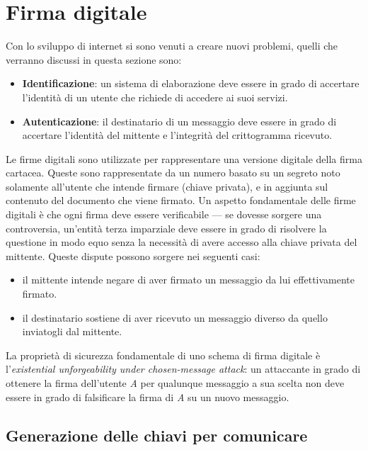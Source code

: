 \documentclass[12pt, a4paper]{report}
\begin{document}
\section{Firma digitale}
\label{sec:firma_digitale}
Con lo sviluppo di internet si sono venuti a creare nuovi problemi, quelli che verranno discussi in questa sezione sono:
\begin{itemize}
\item \textbf{Identificazione}: un sistema di elaborazione deve essere in grado di accertare l'identità di un utente che richiede di accedere ai suoi servizi.
\item \textbf{Autenticazione}: il destinatario di un messaggio deve essere in grado di accertare l'identità del mittente e l'integrità del crittogramma ricevuto.
\end{itemize}
Le firme digitali sono utilizzate per rappresentare una versione digitale della firma cartacea. Queste sono rappresentate da un numero basato su un segreto noto solamente all'utente che intende firmare (chiave privata), e in aggiunta sul contenuto del documento che viene firmato.
Un aspetto fondamentale delle firme digitali è che ogni firma deve essere verificabile — se dovesse sorgere una controversia, un'entità terza imparziale deve essere in grado di risolvere la questione in modo equo senza la necessità di avere accesso alla chiave privata del mittente. Queste dispute possono sorgere nei seguenti casi:
\begin{itemize}
\item il mittente intende negare di aver firmato un messaggio da lui effettivamente firmato.
\item il destinatario sostiene di aver ricevuto un messaggio diverso da quello inviatogli dal mittente.
\end{itemize}
La proprietà di sicurezza fondamentale di uno schema di firma digitale è l'\textit{existential unforgeability under chosen-message attack}: un attaccante in grado di ottenere la firma dell'utente \textit{A} per qualunque messaggio a sua scelta non deve essere in grado di falsificare la firma di \textit{A} su un nuovo messaggio. \cite{Johnson}
\subsection{Generazione delle chiavi per comunicare}
\end{document}
